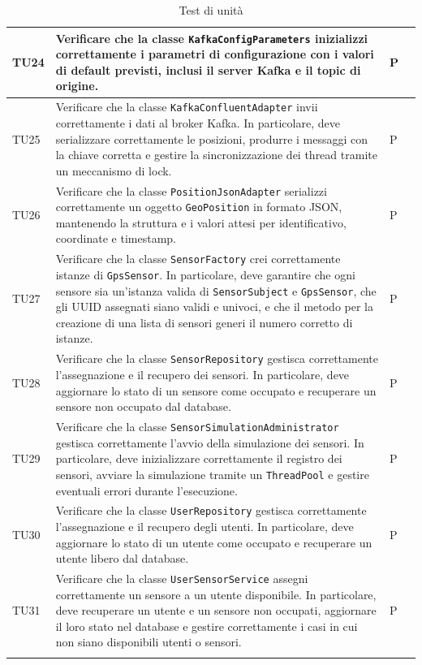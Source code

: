 \documentclass[10pt]{article}
\begin{document}
\begin{justify}
\begin{longtable}{|>{\centering\arraybackslash}m{2cm}|>{\centering\arraybackslash}m{7cm}|>{\centering\arraybackslash}m{2cm}|>{\centering\arraybackslash}m{2cm}|}
\hline
TU24 & Verificare che la classe \texttt{KafkaConfigParameters} inizializzi correttamente i parametri di configurazione con i valori di default previsti, inclusi il server Kafka e il topic di origine. & P \\
\hline
TU25 & Verificare che la classe \texttt{KafkaConfluentAdapter} invii correttamente i dati al broker Kafka. In particolare, deve serializzare correttamente le posizioni, produrre i messaggi con la chiave corretta e gestire la sincronizzazione dei thread tramite un meccanismo di lock. & P \\
\hline
TU26 & Verificare che la classe \texttt{PositionJsonAdapter} serializzi correttamente un oggetto \texttt{GeoPosition} in formato JSON, mantenendo la struttura e i valori attesi per identificativo, coordinate e timestamp. & P \\
\hline
TU27 & Verificare che la classe \texttt{SensorFactory} crei correttamente istanze di \texttt{GpsSensor}. In particolare, deve garantire che ogni sensore sia un'istanza valida di \texttt{SensorSubject} e \texttt{GpsSensor}, che gli UUID assegnati siano validi e univoci, e che il metodo per la creazione di una lista di sensori generi il numero corretto di istanze. & P \\
\hline
TU28 & Verificare che la classe \texttt{SensorRepository} gestisca correttamente l'assegnazione e il recupero dei sensori. In particolare, deve aggiornare lo stato di un sensore come occupato e recuperare un sensore non occupato dal database. & P \\
\hline
TU29 & Verificare che la classe \texttt{SensorSimulationAdministrator} gestisca correttamente l'avvio della simulazione dei sensori. In particolare, deve inizializzare correttamente il registro dei sensori, avviare la simulazione tramite un \texttt{ThreadPool} e gestire eventuali errori durante l'esecuzione. & P \\
\hline
TU30 & Verificare che la classe \texttt{UserRepository} gestisca correttamente l'assegnazione e il recupero degli utenti. In particolare, deve aggiornare lo stato di un utente come occupato e recuperare un utente libero dal database. & P \\
\hline
TU31 & Verificare che la classe \texttt{UserSensorService} assegni correttamente un sensore a un utente disponibile. In particolare, deve recuperare un utente e un sensore non occupati, aggiornare il loro stato nel database e gestire correttamente i casi in cui non siano disponibili utenti o sensori. & P \\
\hline
\caption{Test di unità}\\
\end{longtable}



\end{justify}
\end{document}
